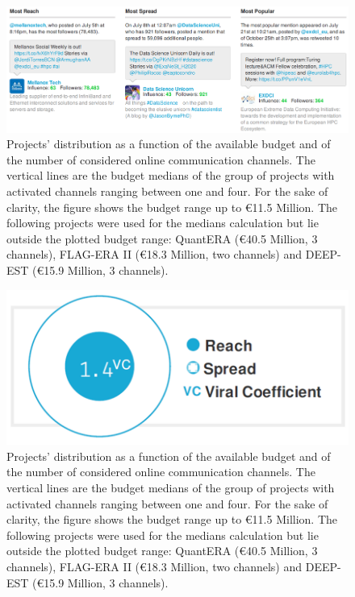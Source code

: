 \begin{figure}[!t] 
 \begin{center}
 \includegraphics[scale=0.41]{Images/HPC_Most_reach_spread_popular.png}
 \caption{Projects' distribution as a function of the available budget and of the number of considered online communication channels. The vertical lines are the budget medians of the group of projects with activated channels ranging between one and four. For the sake of clarity, the figure shows the budget range up to \euro 11.5 Million. The following projects were used for the medians calculation but lie outside the plotted budget range: QuantERA (\euro 40.5 Million, 3 channels), FLAG-ERA II (\euro 18.3 Million, two channels) and DEEP-EST (\euro 15.9 Million, 3 channels).}
 \label{HPC_Most_reach_spread_popular}
 \end{center}
\end{figure}

\begin{figure}[t] 
 \begin{center}
 \includegraphics[scale=0.2]{Images/HPC_viral_coefficient.png}
 \caption{Projects' distribution as a function of the available budget and of the number of considered online communication channels. The vertical lines are the budget medians of the group of projects with activated channels ranging between one and four. For the sake of clarity, the figure shows the budget range up to \euro 11.5 Million. The following projects were used for the medians calculation but lie outside the plotted budget range: QuantERA (\euro 40.5 Million, 3 channels), FLAG-ERA II (\euro 18.3 Million, two channels) and DEEP-EST (\euro 15.9 Million, 3 channels).}
 \label{HPC_viral_coefficient}
 \end{center}
\end{figure}

